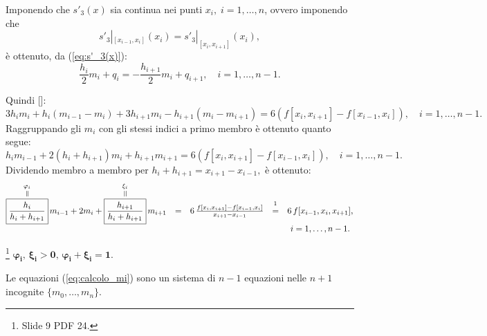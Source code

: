 Imponendo che $s'_3(x)$ sia continua nei punti $x_i,\; i=1,\hdots,n$, ovvero imponendo che
\begin{equation*}
    s'_3|_{[x_{i-1}, x_i]}(x_i)=s'_3|_{[x_i, x_{i+1}]}(x_i),
\end{equation*}
è ottenuto, da (\ref{eq:s'_3(x)}):
\begin{equation*}
    \frac{h_i}{2}m_i+q_i=-\frac{h_{i+1}}{2}m_i+q_{i+1},\quad i=1,\hdots,n-1.
\end{equation*}

Quindi [\footnotemark]:
\begin{equation*}
    3h_im_i+h_i(m_{i-1}-m_i)+3h_{i+1}m_i-h_{i+1}(m_i-m_{i+1})=6\left(f[x_i,x_{i+1}]-f[x_{i-1},x_i]\right),\quad i=1,\hdots,n-1.
\end{equation*}
Raggruppando gli $m_i$ con gli stessi indici a primo membro è ottenuto quanto segue:
\begin{equation*}
    h_im_{i-1}+2(h_i+h_{i+1})m_i+h_{i+1}m_{i+1}=6(f[x_i,x_{i+1}]-f[x_{i-1},x_i]),\quad i=1,\hdots,n-1.
\end{equation*}
Dividendo membro a membro per $h_i+h_{i+1}=x_{i+1}-x_{i-1},$ è ottenuto:
\begin{equation}\label{eq:calcolo_mi}
    \begin{matrix}
        \equaltoup{\boxed{\frac{h_i}{h_i+h_{i+1}}}}{\varphi_i}\,m_{i-1}+2m_i+\equaltoup{\boxed{\frac{h_{i+1}}{h_i+h_{i+1}}}}{\xi_i}\,m_{i+1}&=&6\,\frac{f[x_i,x_{i+1}]-f[x_{i-1},x_i]}{x_{i+1}-x_{i-1}}&\overset{\footnotemark}{=}&6\,f[x_{i-1},x_i,x_{i+1}],\\
        && && i=1,\hdots,n-1.
    \end{matrix}
\end{equation} 

\begin{remark}\label{re:varphi+xi=1}\footnote{Slide 9 PDF 24.}
    $\boldsymbol{\varphi_i,\, \xi_i>0,\, \varphi_i+\xi_i=1.}$
\end{remark}

Le equazioni (\ref{eq:calcolo_mi}) sono un sistema di $n-1$ equazioni nelle $n+1$ incognite $\{m_0,\hdots,m_n\}$.

